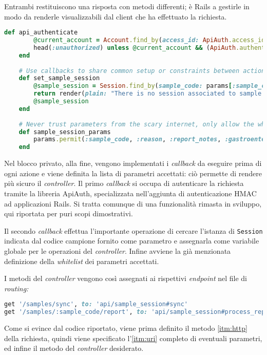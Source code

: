 Entrambi restituiscono una risposta con metodi differenti; è Rails a gestirle in modo da renderle visualizzabili dal client che ha effettuato la richiesta.
\begin{lstlisting}[caption={\textbf{\texttt{sample\_session\_controller.rb}}},captionpos=b,language=Ruby]
    def api_authenticate
        @current_account = Account.find_by(access_id: ApiAuth.access_id(request))
        head(:unauthorized) unless @current_account && (ApiAuth.authentic?(request, @current_account.secret) || Rails.env == 'test')
    end
    
    # Use callbacks to share common setup or constraints between actions.
    def set_sample_session
        @sample_session = Session.find_by(sample_code: params[:sample_code])
        return render(plain: "There is no session associated to sample code #{params[:sample_code]}.", status: :bad_request) unless @sample_session
        @sample_session
    end
    
    # Never trust parameters from the scary internet, only allow the white list through.
    def sample_session_params
        params.permit(:sample_code, :reason, :report_notes, :gastroenterologist_notes_general, :gastroenterologist_notes_specific, :active_substance, :report, :timestamp)
    end
\end{lstlisting}
Nel blocco privato, alla fine, vengono implementati i \textit{callback} da eseguire prima di ogni azione e viene definita la lista di parametri accettati: ciò permette di rendere più sicuro il \textit{controller}.
Il primo \textit{callback} si occupa di autenticare la richiesta tramite la libreria ApiAuth, specializzata nell'aggiunta di autenticazione HMAC ad applicazioni Rails. Si tratta comunque di una funzionalità rimasta in sviluppo, qui riportata per puri scopi dimostrativi.

Il secondo \textit{callback} effettua l'importante operazione di cercare l'istanza di \texttt{Session} indicata dal codice campione fornito come parametro e assegnarla come variabile globale per le operazioni del \textit{controller}. Infine avviene la già menzionata definizione della \textit{whitelist} dei parametri accettati.

I metodi del \textit{controller} vengono così assegnati ai rispettivi \textit{endpoint} nel file di \textit{routing:}
\begin{lstlisting}[language=Ruby]
get '/samples/sync', to: 'api/sample_session#sync'
get '/samples/:sample_code/report', to: 'api/sample_session#process_report'
\end{lstlisting}
Come si evince dal codice riportato, viene prima definito il metodo \ref{itm:http} della richiesta, quindi viene specificato l'\ref{itm:uri} completo di eventuali parametri, ed infine il metodo del \textit{controller} desiderato.

